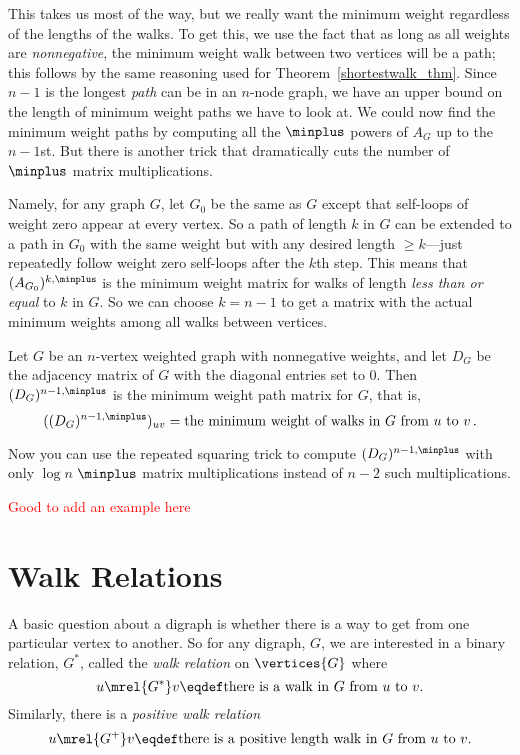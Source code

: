 \begin{editingnotes}
This takes us most of the way, but we really want the minimum weight
regardless of the lengths of the walks.  To get this, we use the fact that
as long as all weights are \emph{nonnegative}, the minimum weight walk
between two vertices will be a path; this follows by the same reasoning
used for Theorem~\ref{shortestwalk_thm}.  Since $n-1$ is the longest \emph{path}
can be in an $n$-node graph, we have an upper bound on the length of
minimum weight paths we have to look at.  We could now find the minimum
weight paths by computing all the $\minplus$ powers of $A_G$ up to the
$n-1$st.  But there is another trick that dramatically cuts the number of
$\minplus$ matrix multiplications.

Namely, for any graph $G$, let $G_0$ be the same as $G$ except that
self-loops of weight zero appear at every vertex.  So a path of length $k$
in $G$ can be extended to a path in $G_0$ with the same weight but with
any desired length $ \geq k$---just repeatedly follow weight zero
self-loops after the $k$th step.  This means that $(A_{G_0})^{k, \minplus}$
is the minimum weight matrix for walks of length \emph{less than or equal}
to $k$ in $G$.  So we can choose $k = n-1$ to get a matrix with the
actual minimum weights among all walks between vertices.

\begin{theorem}\label{thm:minweightmatrix}
Let $G$ be an $n$-vertex weighted graph with nonnegative weights, and let
$D_G$ be the adjacency matrix of $G$ with the diagonal entries set to 0.
Then $(D_G)^{n-1, \minplus}$ is the minimum weight path matrix for $G$, that
is,
\[
((D_G)^{n-1, \minplus})_{uv} = \text{the minimum weight of walks in $G$ from
 $u$ to $v$}\,.
\]
\end{theorem}
Now you can use the repeated squaring trick to compute $(D_G)^{n-1,
  \minplus}$ with only $\log n$ $\minplus$ matrix multiplications
instead of $n-2$ such multiplications.

\textcolor{red}{Good to add an example here}
\end{editingnotes}

\section{Walk Relations}\label{walk_relation_sec}
A basic question about a digraph is whether there is a way to get from one
particular vertex to another.  So for any digraph, $G$, we are
interested in a binary relation, $G^*$, called the \emph{walk
  relation}%
 on $\vertices{G}$ where
\begin{equation}\label{G*def}
u \mrel{G^*} v \eqdef \mbox{there is a walk in $G$ from $u$ to $v$}.
\end{equation}
Similarly, there is a \emph{positive walk relation}
\begin{equation}\label{G+def}
u \mrel{G^+} v \eqdef \mbox{there is a positive length walk in $G$ from 
$u$ to $v$}.
\end{equation}

